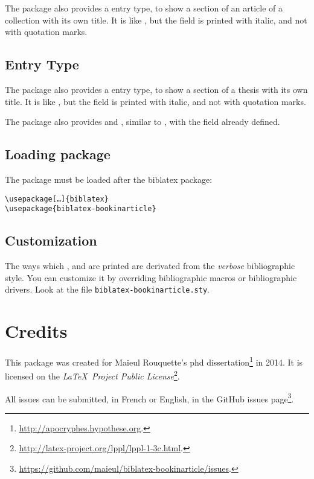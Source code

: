 \documentclass{ltxdockit}[2011/03/25]
\newcommand{\biblatex}{biblatex\xspace}
\begin{document}
The package also provides a  entry type, to show a section of an article of a collection with its own title. It is like , but the  field is printed with italic, and not with quotation marks.

\subsection{ Entry Type}

The package also provides a  entry type, to show a section of a thesis with its own title. It is like , but the  field is printed with italic, and not with quotation marks.

The package also provides  and , similar to , with the  field already defined.


\subsection{Loading package}

The package must be loaded after the \biblatex package:
\begin{verbatim}
\usepackage[…]{biblatex}
\usepackage{biblatex-bookinarticle}
\end{verbatim}

\subsection{Customization}

The ways which ,  and  are printed are derivated from the \emph{verbose} bibliographic style. You can customize it by overriding bibliographic macros or bibliographic drivers. Look at the file \verb+biblatex-bookinarticle.sty+.

\section{Credits}

This package was created for Maïeul Rouquette's phd dissertation\footnote{\url{http://apocryphes.hypothese.org}.} in 2014. It is licensed on the \emph{\LaTeX\ Project Public License}\footnote{\url{http://latex-project.org/lppl/lppl-1-3c.html}.}. 


All issues can be submitted, in French or English, in the GitHub issues page\footnote{\url{https://github.com/maieul/biblatex-bookinarticle/issues}.}.
\end{document}
